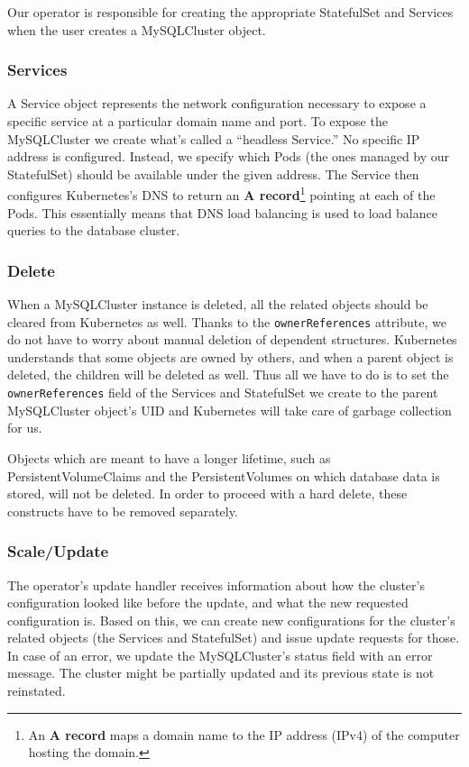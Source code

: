 Our operator is responsible for creating the appropriate StatefulSet and Services when the user
creates a MySQLCluster object.

\subsubsection*{Services}
A Service object represents the network configuration necessary to expose a specific service at a
particular domain name and port. To expose the MySQLCluster we create what’s called a
“headless Service.” No specific IP address is configured. Instead, we specify which Pods (the ones
managed by our StatefulSet) should be available under the given address. The Service then configures
Kubernetes’s DNS to return an \textbf{A record}\footnote{An \textbf{A record} maps a domain name to
the IP address (IPv4) of the computer hosting the domain.} pointing at each of the Pods. This
essentially means that DNS load balancing is used to load balance queries to the database cluster.

\subsubsection*{Delete}
When a MySQLCluster instance is deleted, all the related objects should be cleared from Kubernetes
as well. Thanks to the \texttt{ownerReferences} attribute, we do not have to worry about manual
deletion of dependent structures. Kubernetes understands that some objects are owned by others, and
when a parent object is deleted, the children will be deleted as well. Thus all we have to do is to set
the \texttt{ownerReferences} field of the Services and StatefulSet we create to the parent
MySQLCluster object’s UID and Kubernetes will take care of garbage collection for us.

Objects which are meant to have a longer lifetime, such as PersistentVolumeClaims and the
PersistentVolumes on which database data is stored, will not be deleted. In order to
proceed with a hard delete, these constructs have to be removed separately.

\subsubsection*{Scale/Update}
The operator’s update handler receives information about how the cluster’s configuration looked
like before the update, and what the new requested configuration is. Based on this, we can create
new configurations for the cluster’s related objects (the Services and StatefulSet) and issue update
requests for those. In case of an error, we update the MySQLCluster’s status field with an error
message. The cluster might be partially updated and its previous state is not reinstated.

